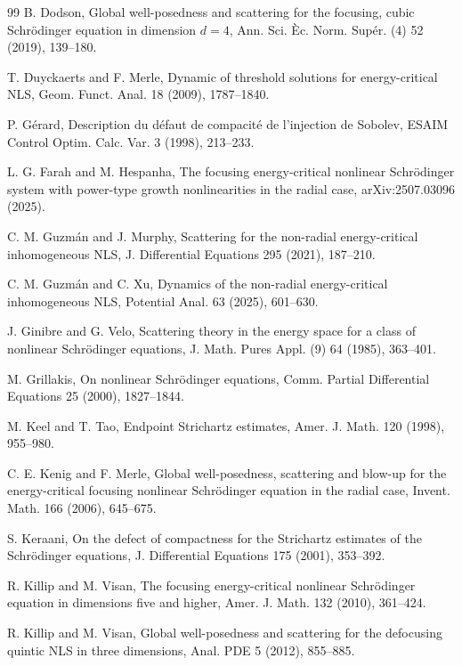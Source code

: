 \documentclass{interact}
\numberwithin{equation}{section}
\theoremstyle{plain}
\theoremstyle{definition}
\theoremstyle{remark}
\begin{document}
\begin{thebibliography}{99}
B. Dodson, Global well-posedness and scattering for the focusing, cubic Schr\"odinger equation in dimension $d=4$,
Ann. Sci. \`Ec. Norm. Sup\'er. (4) 52 (2019), 139--180.

T. Duyckaerts and F. Merle, Dynamic of threshold solutions for energy-critical NLS, Geom. Funct. Anal. 18 (2009), 1787--1840.

P. G\'erard, Description du d\'efaut de compacit\'e de l'injection de Sobolev, ESAIM Control Optim. Calc. Var. 3 (1998), 213--233.

L. G. Farah and M. Hespanha, The focusing energy-critical nonlinear Schr\"odinger system with power-type growth nonlinearities in the radial case, arXiv:2507.03096 (2025).

C. M. Guzm\'an and J. Murphy, Scattering for the non-radial energy-critical inhomogeneous NLS, J. Differential Equations 295 (2021), 187--210.

C. M. Guzm\'an and C. Xu, Dynamics of the non-radial energy-critical inhomogeneous NLS, Potential Anal. 63 (2025), 601--630.

J. Ginibre and G. Velo, Scattering theory in the energy space for a class of nonlinear Schr\"odinger equations, J. Math. Pures Appl. (9) 64 (1985), 363--401.

M. Grillakis, On nonlinear Schr\"odinger equations, Comm. Partial Differential Equations 25 (2000), 1827--1844.

M. Keel and T. Tao, Endpoint Strichartz estimates, Amer. J. Math. 120 (1998), 955--980.

C. E. Kenig and F. Merle, Global well-posedness, scattering and blow-up for the energy-critical focusing nonlinear Schr\"odinger equation in the radial case, Invent. Math. 166 (2006), 645--675.

S. Keraani, On the defect of compactness for the Strichartz estimates of the Schr\"odinger equations, J. Differential Equations 175 (2001), 353--392.

R. Killip and M. Visan, The focusing energy-critical nonlinear Schr\"odinger equation in dimensions five and higher,
Amer. J. Math. 132 (2010), 361--424.

R. Killip and M. Visan, Global well-posedness and scattering for the defocusing quintic NLS in three dimensions, Anal. PDE 5 (2012), 855--885.


\end{thebibliography}
\end{document}
